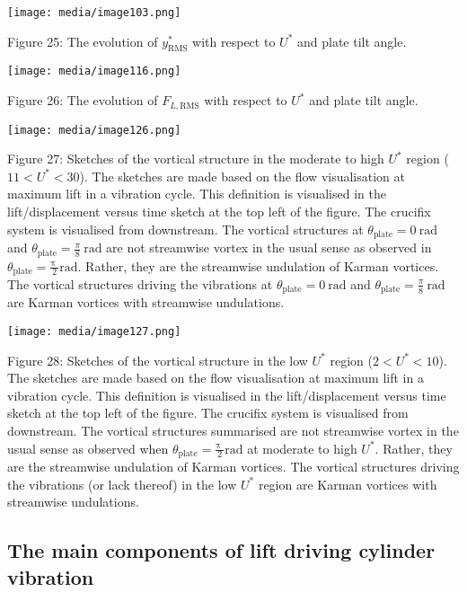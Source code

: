 \documentclass[]{article}
\begin{document}
\texttt{[image: media/image103.png]}

\protect\hypertarget{_Toc41048845}{}{}Figure 25: The evolution of
\(y_{\text{RMS}}^{*}\) with respect to \(U^{*}\) and plate tilt angle.

\texttt{[image: media/image116.png]}

\protect\hypertarget{_Toc41048846}{}{}Figure 26: The evolution of
\(F_{L,\text{RMS}}\) with respect to \(U^{*}\) and plate tilt angle.

\texttt{[image: media/image126.png]}

\protect\hypertarget{_Toc41048847}{}{}Figure 27: Sketches of the
vortical structure in the moderate to high \(U^{*}\) region
(\(11 < U^{*} < 30\)). The sketches are made based on the flow
visualisation at maximum lift in a vibration cycle. This definition is
visualised in the lift/displacement versus time sketch at the top left
of the figure. The crucifix system is visualised from downstream. The
vortical structures at \(\theta_{\text{plate}} = 0\ \text{rad}\) and
\(\theta_{\text{plate}} = \frac{\pi}{8}\ \text{rad}\) are not streamwise
vortex in the usual sense as observed in
\(\theta_{\text{plate}} = \frac{\text{π~}}{2}\text{rad}\). Rather, they
are the streamwise undulation of Karman vortices. The vortical
structures driving the vibrations at
\(\theta_{\text{plate}} = 0\ \text{rad}\) and
\(\theta_{\text{plate}} = \frac{\pi}{8}\ \text{rad}\) are Karman
vortices with streamwise undulations.

\texttt{[image: media/image127.png]}

\protect\hypertarget{_Toc41048848}{}{}Figure 28: Sketches of the
vortical structure in the low \(U^{*}\) region (\(2 < U^{*} < 10\)). The
sketches are made based on the flow visualisation at maximum lift in a
vibration cycle. This definition is visualised in the lift/displacement
versus time sketch at the top left of the figure. The crucifix system is
visualised from downstream. The vortical structures summarised are not
streamwise vortex in the usual sense as observed when
\(\theta_{\text{plate}} = \frac{\text{π~}}{2}\text{rad}\) at moderate to
high \(U^{*}\). Rather, they are the streamwise undulation of Karman
vortices. The vortical structures driving the vibrations (or lack
thereof) in the low \(U^{*}\) region are Karman vortices with streamwise
undulations.

\hypertarget{the-main-components-of-lift-driving-cylinder-vibration}{\subsection{The
main components of lift driving cylinder
vibration}\label{the-main-components-of-lift-driving-cylinder-vibration}}
\end{document}
